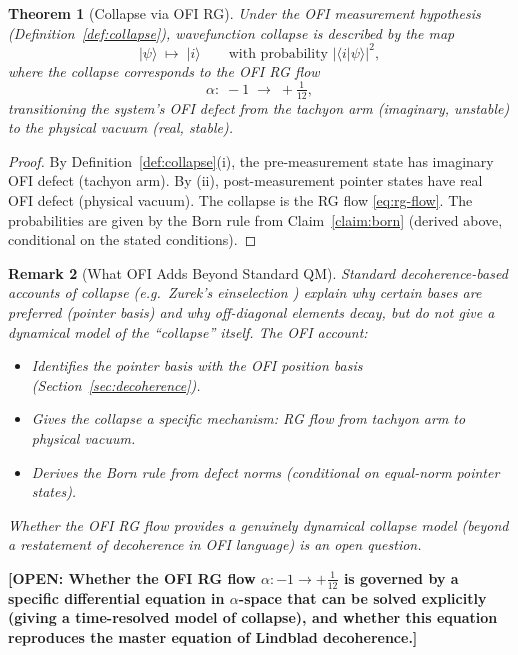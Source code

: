\documentclass[12pt]{article}
\newtheorem{theorem}{Theorem}[section]
\newtheorem{remark}[theorem]{Remark}
\theoremstyle{definition}
\newcommand{\OPEN}[1]{\textcolor{opencolor}{\textbf{[OPEN: #1]}}}
\begin{document}
\begin{theorem}[Collapse via OFI RG]
\label{thm:collapse}
Under the OFI measurement hypothesis (Definition~\ref{def:collapse}),
wavefunction collapse is described by the map
\begin{equation}
  |\psi\rangle \;\longmapsto\; |i\rangle
  \qquad\text{with probability }|\langle i|\psi\rangle|^2,
\end{equation}
where the collapse corresponds to the OFI RG flow
\begin{equation}
  \alpha: \;-1 \;\longrightarrow\; +\tfrac{1}{12},
  \label{eq:rg-flow}
\end{equation}
transitioning the system's OFI defect from the tachyon arm (imaginary,
unstable) to the physical vacuum (real, stable).
\end{theorem}

\begin{proof}
By Definition~\ref{def:collapse}(i), the pre-measurement state has
imaginary OFI defect (tachyon arm).  By (ii), post-measurement pointer
states have real OFI defect (physical vacuum).  The collapse is the RG
flow \eqref{eq:rg-flow}.  The probabilities are given by the Born
rule from Claim~\ref{claim:born} (derived above, conditional on
the stated conditions).
\end{proof}

\begin{remark}[What OFI Adds Beyond Standard QM]
Standard decoherence-based accounts of collapse (e.g.\ Zurek's
einselection \cite{Zurek2003}) explain why certain bases are preferred
(pointer basis) and why off-diagonal elements decay, but do not give a
dynamical model of the ``collapse'' itself.  The OFI account:
\begin{itemize}[leftmargin=2em]
\item Identifies the pointer basis with the OFI position basis
  (Section~\ref{sec:decoherence}).
\item Gives the collapse a specific mechanism: RG flow from tachyon
  arm to physical vacuum.
\item Derives the Born rule from defect norms (conditional on equal-norm
  pointer states).
\end{itemize}
Whether the OFI RG flow provides a genuinely dynamical collapse model
(beyond a restatement of decoherence in OFI language) is an open question.
\end{remark}

\OPEN{Whether the OFI RG flow $\alpha: -1 \to +\tfrac{1}{12}$ is
governed by a specific differential equation in $\alpha$-space that
can be solved explicitly (giving a time-resolved model of collapse),
and whether this equation reproduces the master equation of Lindblad
decoherence.}
\end{document}
